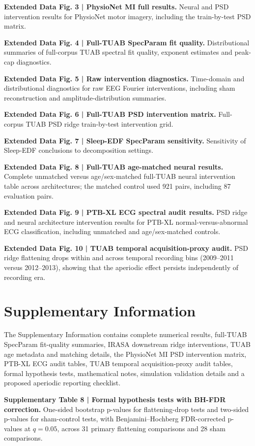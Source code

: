 \documentclass[pdflatex,sn-nature]{sn-jnl}
\begin{document}
\textbf{Extended Data Fig. 3 | PhysioNet MI full results.} Neural and PSD intervention results for PhysioNet motor imagery, including the train-by-test PSD matrix.

\textbf{Extended Data Fig. 4 | Full-TUAB SpecParam fit quality.} Distributional summaries of full-corpus TUAB spectral fit quality, exponent estimates and peak-cap diagnostics.

\textbf{Extended Data Fig. 5 | Raw intervention diagnostics.} Time-domain and distributional diagnostics for raw EEG Fourier interventions, including sham reconstruction and amplitude-distribution summaries.

\textbf{Extended Data Fig. 6 | Full-TUAB PSD intervention matrix.} Full-corpus TUAB PSD ridge train-by-test intervention grid.

\textbf{Extended Data Fig. 7 | Sleep-EDF SpecParam sensitivity.} Sensitivity of Sleep-EDF conclusions to decomposition settings.

\textbf{Extended Data Fig. 8 | Full-TUAB age-matched neural results.} Complete unmatched versus age/sex-matched full-TUAB neural intervention table across architectures; the matched control used 921 pairs, including 87 evaluation pairs.

\textbf{Extended Data Fig. 9 | PTB-XL ECG spectral audit results.} PSD ridge and neural architecture intervention results for PTB-XL normal-versus-abnormal ECG classification, including unmatched and age/sex-matched controls.

\textbf{Extended Data Fig. 10 | TUAB temporal acquisition-proxy audit.} PSD ridge flattening drops within and across temporal recording bins (2009--2011 versus 2012--2013), showing that the aperiodic effect persists independently of recording era.

\section*{Supplementary Information}

The Supplementary Information contains complete numerical results, full-TUAB SpecParam fit-quality summaries, IRASA downstream ridge interventions, TUAB age metadata and matching details, the PhysioNet MI PSD intervention matrix, PTB-XL ECG audit tables, TUAB temporal acquisition-proxy audit tables, formal hypothesis tests, mathematical notes, simulation validation details and a proposed aperiodic reporting checklist.

\textbf{Supplementary Table 8 | Formal hypothesis tests with BH-FDR correction.} One-sided bootstrap p-values for flattening-drop tests and two-sided p-values for sham-control tests, with Benjamini--Hochberg FDR-corrected p-values at $q=0.05$, across 31 primary flattening comparisons and 28 sham comparisons.
\end{document}
